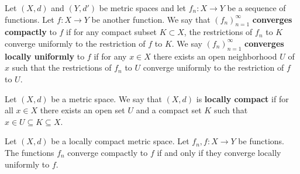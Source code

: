 \begin{definition}

Let \((X,d)\) and \((Y, d')\) be metric spaces and let \(f_n: X \to Y\) be a sequence of functions. Let \(f: X \to Y\) be another function. We say that \((f_n)_{n=1}^\infty\) \textbf{converges compactly} to \(f\) if for any compact subset \(K \subset X\), the restrictions of \(f_n\) to \(K\) converge uniformly to the restriction of \(f\) to \(K\). We say \((f_n)_{n=1}^\infty\) \textbf{converges locally uniformly} to \(f\) if for any \(x \in X\) there exists an open neighborhood \(U\) of \(x\) such that the restrictions of \(f_n\) to \(U\) converge uniformly to the restriction of \(f\) to \(U\).

\end{definition}

\begin{definition}

Let \((X,d)\) be a metric space. We say that \((X,d)\) is \textbf{locally compact} if for all \(x \in X\) there exists an open set \(U\) and a compact set \(K\) such that \(x \in U \subseteq K \subseteq X\).

\end{definition}

\begin{proposition}

Let \((X,d)\) be a locally compact metric space. Let \(f_n, f: X \to Y\) be functions. The functions \(f_n\) converge compactly to \(f\) if and only if they converge locally uniformly to \(f\).

\end{proposition}

